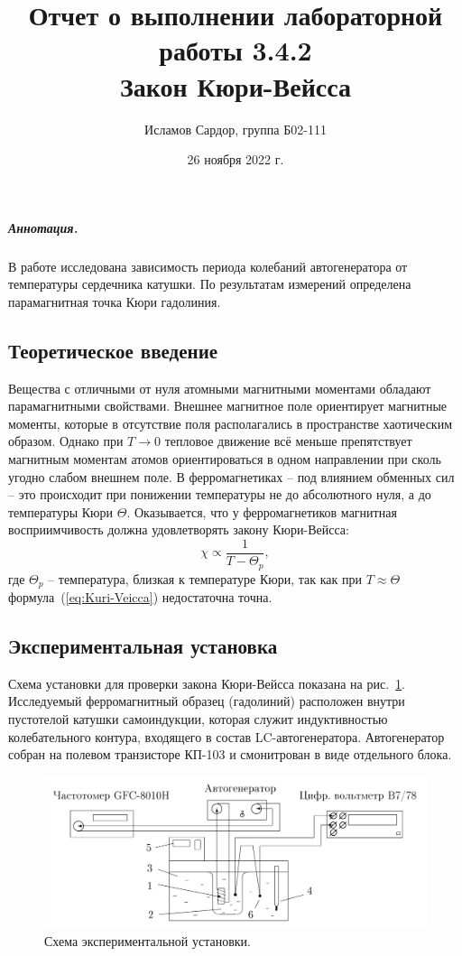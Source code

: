 \documentclass[12pt,a4paper]{article}
\title{Отчет о выполнении лабораторной работы 3.4.2\\
Закон Кюри-Вейсса}
\author{Исламов Сардор, группа Б02-111}
\date{26 ноября 2022 г.}
\begin{document}
\maketitle
\subparagraph*{Аннотация.} 
В работе исследована зависимость периода колебаний автогенератора от температуры сердечника катушки.
По результатам измерений определена парамагнитная точка Кюри гадолиния.

\subsection*{Теоретическое введение}
Вещества с отличными от нуля атомными магнитными моментами обладают парамагнитными свойствами. 
Внешнее магнитное поле ориентирует магнитные моменты, которые в отсутствие поля располагались в пространстве хаотическим образом. 
Однако при $T \rightarrow 0$ тепловое движение всё меньше препятствует магнитным моментам атомов ориентироваться в одном направлении при сколь угодно слабом внешнем поле. 
В ферромагнетиках -- под влиянием обменных сил -- это происходит при понижении температуры не до абсолютного нуля, а до температуры Кюри $\Theta$. 
Оказывается, что у ферромагнетиков магнитная восприимчивость должна удовлетворять закону Кюри-Вейсса:
\begin{equation}
    \label{eq:Kuri-Veicca}
    \chi \propto \frac{1}{T-\Theta_p},
\end{equation}
где $\Theta_p$ -- температура, близкая к температуре Кюри, так как при $T \approx \Theta$ формула~(\ref{eq:Kuri-Veicca}) недостаточна точна.

\subsection*{Экспериментальная установка}
Схема установки для проверки закона Кюри-Вейсса показана на рис.~\ref{ris:ustanovka}. Исследуемый ферромагнитный образец (гадолиний) расположен внутри пустотелой катушки самоиндукции, которая служит индуктивностью колебательного контура, входящего в состав LC-автогенератора. 
Автогенератор собран на полевом транзисторе КП-103 и смонитрован в виде отдельного блока.
\begin{figure}[H]
    \centering
    \includegraphics[width=0.7\linewidth]{pics/scheme.png}
    \caption{Схема экспериментальной установки.}
    \label{ris:ustanovka}
\end{figure}
\end{document}
